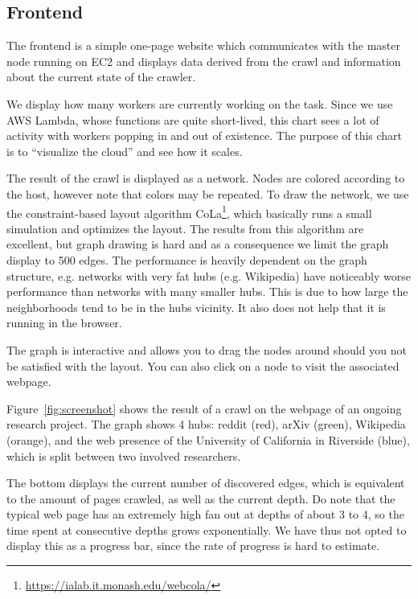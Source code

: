 \documentclass[english]{scrartcl}
\begin{document}
\subsection{Frontend}

The frontend is a simple one-page website which communicates with the
master node running on EC2 and displays data derived from the crawl and
information about the current state of the crawler.

We display how many workers are currently working on the task. Since we use AWS
Lambda, whose functions are quite short-lived, this chart sees a lot of
activity with workers popping in and out of existence. The purpose of this
chart is to ``visualize the cloud'' and see how it scales.

The result of the crawl is displayed as a network. Nodes are colored according
to the host, however note that colors may be repeated. To draw the network, we
use the constraint-based layout algorithm
CoLa\footnote{\url{https://ialab.it.monash.edu/webcola/}}, which basically runs
a small simulation and optimizes the layout. The results from this algorithm
are excellent, but graph drawing is hard and as a consequence we limit the
graph display to 500 edges. The performance is heavily dependent on the graph
structure, e.g. networks with very fat hubs (e.g. Wikipedia) have noticeably
worse performance than networks with many smaller hubs. This is due to how
large the neighborhoods tend to be in the hubs vicinity. It also does not help
that it is running in the browser.

The graph is interactive and allows you to drag the nodes around should
you not be satisfied with the layout. You can also click on a node to
visit the associated webpage.

Figure~\ref{fig:screenshot} shows the result of a crawl on the webpage of an
ongoing research project. The graph shows 4 hubs: reddit (red), arXiv (green),
Wikipedia (orange), and the web presence of the University of California in Riverside
(blue), which is split between two involved researchers.

The bottom displays the current number of discovered edges, which is equivalent
to the amount of pages crawled, as well as the current depth. Do note that the
typical web page has an extremely high fan out at depths of about 3 to 4, so
the time spent at consecutive depths grows exponentially. We have thus not
opted to display this as a progress bar, since the rate of progress is hard to
estimate.
\end{document}
